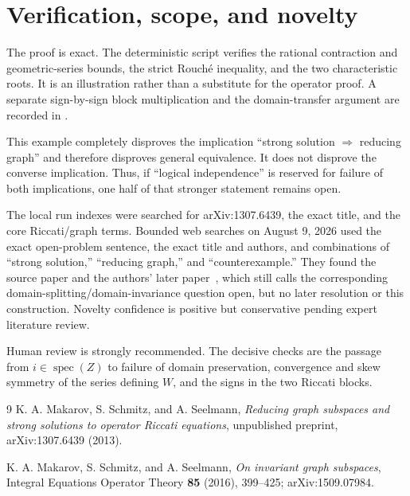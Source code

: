\documentclass[11pt]{article}
\newcommand{\spec}{\operatorname{spec}}
\begin{document}
\section{Verification, scope, and novelty}

The proof is exact.  The deterministic script
 verifies the rational contraction and
geometric-series bounds, the strict Rouch\'e inequality, and the two
characteristic roots.  It is an illustration rather than a substitute for
the operator proof.  A separate sign-by-sign block multiplication and the
domain-transfer argument are recorded in .

This example completely disproves the implication ``strong solution
$\Rightarrow$ reducing graph'' and therefore disproves general equivalence.
It does not disprove the converse implication.  Thus, if ``logical
independence'' is reserved for failure of both implications, one half of that
stronger statement remains open.

The local run indexes were searched for arXiv:1307.6439, the exact title, and
the core Riccati/graph terms.  Bounded web searches on August 9, 2026 used the
exact open-problem sentence, the exact title and authors, and combinations of
``strong solution,'' ``reducing graph,'' and ``counterexample.''  They found
the source paper and the authors' later paper~\cite{MSS16}, which still calls
the corresponding domain-splitting/domain-invariance question open, but no
later resolution or this construction.  Novelty confidence is positive but
conservative pending expert literature review.

Human review is strongly recommended.  The decisive checks are the passage
from $i\in\spec(Z)$ to failure of domain preservation, convergence and skew
symmetry of the series defining $W$, and the signs in the two Riccati blocks.

\begin{thebibliography}{9}
K. A. Makarov, S. Schmitz, and A. Seelmann,
\emph{Reducing graph subspaces and strong solutions to operator Riccati
equations}, unpublished preprint, arXiv:1307.6439 (2013).

K. A. Makarov, S. Schmitz, and A. Seelmann,
\emph{On invariant graph subspaces}, Integral Equations Operator Theory
\textbf{85} (2016), 399--425; arXiv:1509.07984.
\end{thebibliography}
\end{document}
